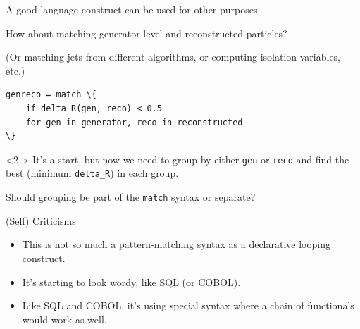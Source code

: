 \documentclass[aspectratio=169]{beamer}
\begin{document}
\begin{frame}[fragile]{A good language construct can be used for other purposes}
\Large
\vspace{0.25 cm}

How about matching generator-level and reconstructed particles?

\vspace{0.25 cm}
{\normalsize (Or matching jets from different algorithms, or computing isolation variables, etc.)}

\normalsize
\vspace{0.25 cm}
\begin{Verbatim}[commandchars=\\\{\}]
genreco = match \{
    if delta_R(gen, reco) < 0.5
    for gen in generator, reco in reconstructed
\}
\end{Verbatim}

\Large
\vspace{0.25 cm}
\begin{uncoverenv}<2->
It's a start, but now we need to group by either {\tt gen} or {\tt reco} and find the best (minimum {\tt delta\_R}) in each group.

\vspace{0.5 cm}
Should grouping be part of the {\tt match} syntax or separate?
\end{uncoverenv}
\end{frame}

\begin{frame}{(Self) Criticisms}
\Large
\vspace{0.5 cm}
\begin{itemize}\setlength{\itemsep}{0.25 cm}
\item This is not so much a pattern-matching syntax as a declarative looping construct.
\item It's starting to look wordy, like SQL (or COBOL).
\item Like SQL and COBOL, it's using special syntax where a chain of functionals would work as well.
\end{itemize}
\end{frame}
\end{document}
